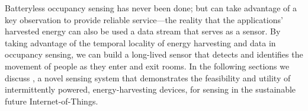 

Batteryless occupancy sensing has never been done; but can take advantage of a key observation to provide reliable service---the reality that the applications' harvested energy can also be used a data stream that serves as a sensor.
By taking advantage of the temporal locality of energy harvesting and data in occupancy sensing, we can build a long-lived sensor that detects and identifies the movement of people as they enter and exit rooms.
In the following sections we discuss \sysname, a novel sensing system that demonstrates the feasibility and utility of intermittently powered, energy-harvesting devices, for sensing in the sustainable future Internet-of-Things.
